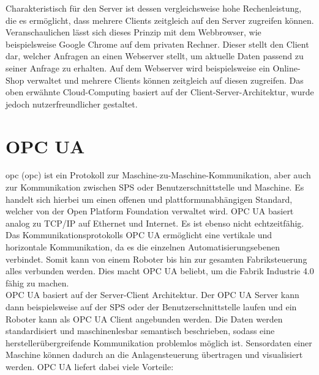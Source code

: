 \documentclass[ a4paper,
                oneside,
                toc=bibliography,
                toc=listof
                ]{scrbook}
\begin{document}
   	Charakteristisch für den Server ist dessen vergleichsweise hohe Rechenleistung, die es ermöglicht, dass mehrere Clients zeitgleich auf den Server zugreifen können. Veranschaulichen lässt sich dieses Prinzip mit dem Webbrowser, wie beispielsweise Google Chrome auf dem privaten Rechner. Dieser stellt den Client dar, welcher Anfragen an einen Webserver stellt, um aktuelle Daten passend zu seiner Anfrage zu erhalten. Auf dem Webserver wird beispielsweise ein Online-Shop verwaltet und mehrere Clients können zeitgleich auf diesen zugreifen. Das oben erwähnte Cloud-Computing basiert auf der Client-Server-Architektur, wurde jedoch nutzerfreundlicher gestaltet. \cite{IT-Sicherheit}
   	\label{sec:TCP/IP}
   	\clearpage
   	\section{OPC UA}
   	\label{sec:OPCUA}
   	\acs{opc} (\acl{opc}) ist ein Protokoll zur Maschine-zu-Maschine-Kommunikation, aber auch zur Kommunikation zwischen SPS oder Benutzerschnittstelle und Maschine. Es handelt sich hierbei um einen offenen und plattformunabhängigen Standard, welcher von der \glqq Open Platform Foundation\grqq{} verwaltet wird. OPC UA basiert analog zu TCP/IP auf Ethernet und Internet. Es ist ebenso nicht echtzeitfähig. Das Kommunikationsprotokolls OPC UA ermöglicht eine vertikale und horizontale Kommunikation, da es die einzelnen Automatisierungsebenen verbindet. Somit kann von einem Roboter bis hin zur gesamten Fabriksteuerung alles verbunden werden. Dies macht OPC UA beliebt, um die Fabrik \glqq Industrie 4.0\grqq{} fähig zu machen. \cite{industrie40} \\
   	OPC UA basiert auf der Server-Client Architektur. Der OPC UA Server kann dann beispielsweise auf der SPS oder der Benutzerschnittstelle laufen und ein Roboter kann als OPC UA Client angebunden werden. Die Daten werden standardisiert und maschinenlesbar semantisch beschrieben, sodass eine herstellerübergreifende Kommunikation problemlos möglich ist. Sensordaten einer Maschine können dadurch an die Anlagensteuerung übertragen und visualisiert werden. OPC UA liefert dabei viele Vorteile: \cite{OPCUA}
\end{document}
